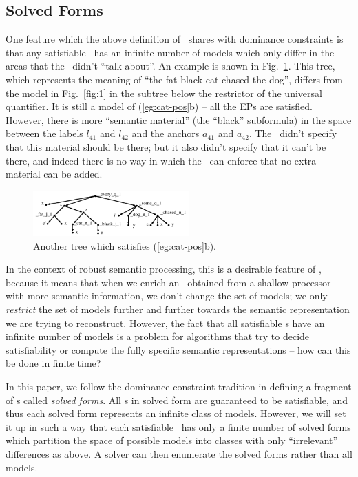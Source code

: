 \subsection{Solved Forms}

One feature which the above definition of \rmrs\ shares with dominance
constraints is that any satisfiable \rmrs\ has an infinite number of
models which only differ in the areas that the \rmrs\ didn't ``talk
about''.  An example is shown in Fig.~\ref{fig:fat-black-cat}.  This
tree, which represents the meaning of ``the fat black cat chased the
dog'', differs from the model in Fig.~\ref{fig:1} in the subtree below
the restrictor of the universal quantifier.  It is still a model of
(\ref{eg:cat-pos}b) -- all the EPs are satisfied.  However, there is
more ``semantic material'' (the ``black'' subformula) in the space
between the labels $l_{41}$ and $l_{42}$ and the anchors $a_{41}$ and
$a_{42}$.  The \rmrs\ didn't specify that this material should be
there; but it also didn't specify that it can't be there, and indeed
there is no way in which the \rmrs\ can enforce that no extra material
can be added.


\begin{figure}
  \centering
  \includegraphics[width=6cm]{pic-more-stuff}
  \caption{Another tree which satisfies (\ref{eg:cat-pos}b).}
  \label{fig:fat-black-cat}
\end{figure}


In the context of robust semantic processing, this is a desirable
feature of \rmrs, because it means that when we enrich an \rmrs\
obtained from a shallow processor with more semantic information, we
don't change the set of models; we only \emph{restrict} the set of
models further and further towards the semantic representation we are
trying to reconstruct.  However, the fact that all satisfiable \rmrs s
have an infinite number of models is a problem for algorithms that try
to decide satisfiability or compute the fully specific semantic
representations -- how can this be done in finite time?

In this paper, we follow the dominance constraint tradition in
defining a fragment of \rmrs s called \emph{solved forms}.  All \rmrs
s in solved form are guaranteed to be satisfiable, and thus each
solved form represents an infinite class of models.  However, we will
set it up in such a way that each satisfiable \rmrs\ has only a finite
number of solved forms which partition the space of possible models
into classes with only ``irrelevant'' differences as above.  A solver
can then enumerate the solved forms rather than all models.

